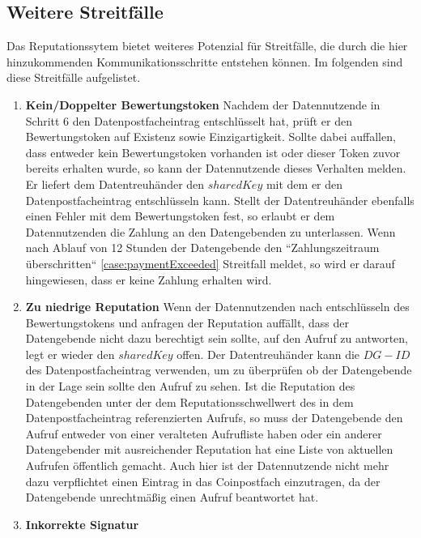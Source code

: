 \documentclass{scrreprt}
\begin{document}
\subsection{Weitere Streitfälle}
\label{subsec:repStreit}
Das Reputationssytem bietet weiteres Potenzial für Streitfälle, die durch die hier hinzukommenden Kommunikationsschritte entstehen können. Im folgenden sind diese Streitfälle aufgelistet.
\begin{enumerate}
    \item \textbf{Kein/Doppelter Bewertungstoken} \label{case:badRepToken}
    Nachdem der Datennutzende in Schritt 6 den Datenpostfacheintrag entschlüsselt hat, prüft er den Bewertungstoken auf Existenz sowie Einzigartigkeit. Sollte dabei auffallen, dass entweder kein Bewertungstoken vorhanden ist oder dieser Token zuvor bereits erhalten wurde, so kann der Datennutzende dieses Verhalten melden. Er liefert dem Datentreuhänder den $sharedKey$ mit dem er den Datenpostfacheintrag entschlüsseln kann. Stellt der Datentreuhänder ebenfalls einen Fehler mit dem Bewertungstoken fest, so erlaubt er dem Datennutzenden die Zahlung an den Datengebenden zu unterlassen. Wenn nach Ablauf von 12 Stunden der Datengebende den ``Zahlungszeitraum überschritten`` \ref{case:paymentExceeded} Streitfall meldet, so wird er darauf hingewiesen, dass er keine Zahlung erhalten wird.
    \item \textbf{Zu niedrige Reputation} \label{case:insufficientRep}
    Wenn der Datennutzenden nach entschlüsseln des Bewertungstokens und anfragen der Reputation auffällt, dass der Datengebende nicht dazu berechtigt sein sollte, auf den Aufruf zu antworten, legt er wieder den $sharedKey$ offen. Der Datentreuhänder kann die $DG-ID$ des Datenpostfacheintrag verwenden, um zu überprüfen ob der Datengebende in der Lage sein sollte den Aufruf zu sehen. Ist die Reputation des Datengebenden unter der dem Reputationsschwellwert des in dem Datenpostfacheintrag referenzierten Aufrufs, so muss der Datengebende den Aufruf entweder von einer veralteten Aufrufliste haben oder ein anderer Datengebender mit ausreichender Reputation hat eine Liste von aktuellen Aufrufen öffentlich gemacht. Auch hier ist der Datennutzende nicht mehr dazu verpflichtet einen Eintrag in das Coinpostfach einzutragen, da der Datengebende unrechtmäßig einen Aufruf beantwortet hat.
    \item \textbf{Inkorrekte Signatur} \label{case:badSignature}

\end{enumerate}
\end{document}
